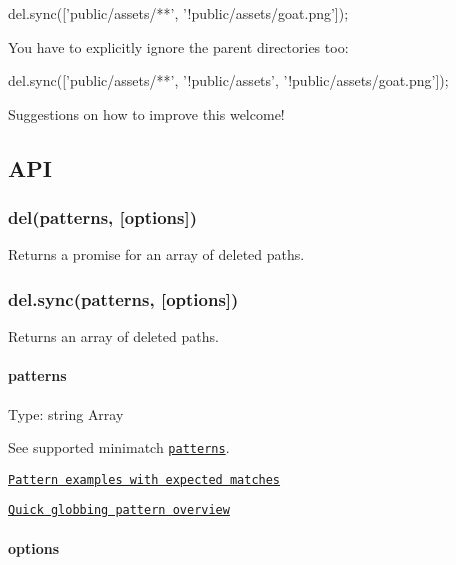 \begin{DoxyCode}
del.sync(['public/assets/**', '!public/assets/goat.png']);
\end{DoxyCode}


You have to explicitly ignore the parent directories too\+:


\begin{DoxyCode}
del.sync(['public/assets/**', '!public/assets', '!public/assets/goat.png']);
\end{DoxyCode}


Suggestions on how to improve this welcome!

\subsection*{A\+PI}

\subsubsection*{del(patterns, \mbox{[}options\mbox{]})}

Returns a promise for an array of deleted paths.

\subsubsection*{del.\+sync(patterns, \mbox{[}options\mbox{]})}

Returns an array of deleted paths.

\paragraph*{patterns}

Type\+: {\ttfamily string} {\ttfamily Array}

See supported minimatch \href{https://github.com/isaacs/minimatch#usage}{\tt patterns}.


\begin{DoxyItemize}
\item \href{https://github.com/sindresorhus/multimatch/blob/master/test.js}{\tt Pattern examples with expected matches}
\item \href{https://github.com/sindresorhus/multimatch#globbing-patterns}{\tt Quick globbing pattern overview}
\end{DoxyItemize}

\paragraph*{options}

